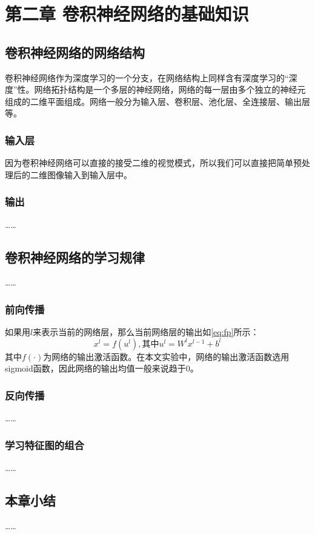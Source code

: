 \chapter{第二章	卷积神经网络的基础知识}
\section{卷积神经网络的网络结构}
卷积神经网络作为深度学习的一个分支，在网络结构上同样含有深度学习的“深度”性。网络拓扑结构是一个多层的神经网络，网络的每一层由多个独立的神经元组成的二维平面组成。网络一般分为输入层、卷积层、池化层、全连接层、输出层等。
\subsection{输入层}
因为卷积神经网络可以直接的接受二维的视觉模式，所以我们可以直接把简单预处理后的二维图像输入到输入层中。
\subsection{输出}
……
\section{卷积神经网络的学习规律}
……
\subsection{前向传播}
如果用$l$来表示当前的网络层，那么当前网络层的输出如\autoref{eq:fp}所示：
\begin{equation}
    \label{eq:fp}
    {x^l} = f({u^l}),\text{其中}{u^l} = {W^l}{x^{l - 1}} + {b^l}
\end{equation}
其中$f(\cdot)$为网络的输出激活函数。在本文实验中，网络的输出激活函数选用sigmoid函数，因此网络的输出均值一般来说趋于0。
\subsection{反向传播}
……
\subsection{学习特征图的组合}
……
\section{本章小结}
……